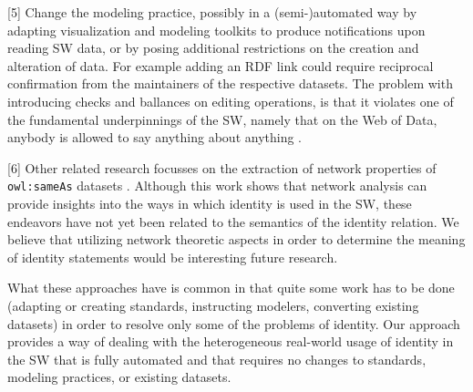 [5] Change the modeling practice, possibly in a (semi-)automated way
  by adapting visualization and modeling toolkits to produce notifications
  upon reading SW data, or by posing additional restrictions on the creation
  and alteration of data. For example adding an RDF link could require
  reciprocal confirmation from the maintainers of the respective datasets.
  \cite{HalpinHayes2010,DingShinavierFininMcguinness2010}
The problem with introducing checks and ballances on editing operations,
  is that it violates one of the fundamental underpinnings of the SW,
  namely that on the Web of Data, anybody is allowed to say
  anything about anything \cite{AntoniouGrothHarmelenHoekstra2012}.

[6] Other related research focusses on the extraction of network properties
  of \texttt{owl:sameAs} datasets \cite{DingShinavierShangguanMcguinness2010}.
Although this work shows that network analysis can provide insights
  into the ways in which identity is used in the SW,
  these endeavors have not yet been related to the semantics of the
  identity relation.
We believe that utilizing network theoretic aspects in order to
  determine the meaning of identity statements
  would be interesting future research.

What these approaches have is common in that quite some work has to be done
  (adapting or creating standards, instructing modelers, converting existing
  datasets) in order to resolve only some of the problems of identity.
Our approach provides a way of dealing with the heterogeneous real-world
  usage of identity in the SW that is fully automated and that requires
  no changes to standards, modeling practices, or existing datasets.

